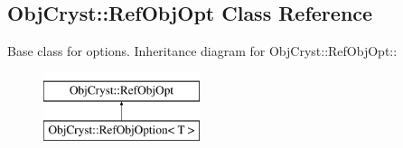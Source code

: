 \subsection{ObjCryst::RefObjOpt Class Reference}
\label{a00077}


Base class for options.  
Inheritance diagram for ObjCryst::RefObjOpt::\begin{figure}[H]
\begin{center}
\leavevmode
\includegraphics[height=2cm]{a00077}
\end{center}
\end{figure}
